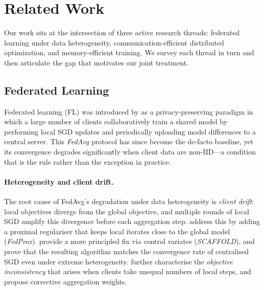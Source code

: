%

\section{Related Work}
\label{sec:related}

Our work sits at the intersection of three active research threads:
federated learning under data heterogeneity, communication-efficient
distributed optimization, and memory-efficient training.  We survey
each thread in turn and then articulate the gap that motivates our
joint treatment.

\subsection{Federated Learning}

Federated learning (FL) was introduced by
\citet{mcmahan2017communication} as a privacy-preserving paradigm in
which a large number of clients collaboratively train a shared model
by performing local SGD updates and periodically uploading model
differences to a central server.  This \emph{FedAvg} protocol has
since become the de-facto baseline, yet its convergence degrades
significantly when client data are non-IID—a condition that is the
rule rather than the exception in practice.

\paragraph{Heterogeneity and client drift.}
The root cause of FedAvg's degradation under data heterogeneity is
\emph{client drift}: local objectives diverge from the global
objective, and multiple rounds of local SGD amplify this divergence
before each aggregation step.  \citet{li2018fedprox} address this by
adding a proximal regulariser that keeps local iterates close to the
global model (\emph{FedProx}).  \citet{karimireddy2020scaffold}
provide a more principled fix via control variates (\emph{SCAFFOLD}),
and prove that the resulting algorithm matches the convergence rate of
centralised SGD even under extreme heterogeneity.
\citet{wang2020tackling} further characterise the \emph{objective
inconsistency} that arises when clients take unequal numbers of local
steps, and propose corrective aggregation weights.

